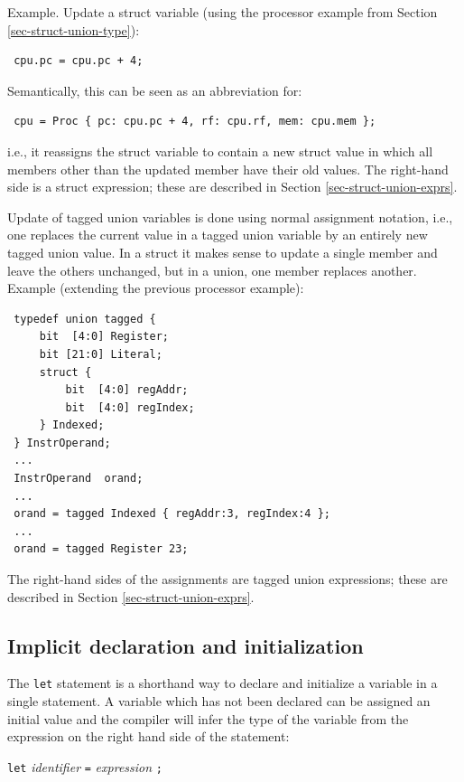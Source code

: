 \documentclass[twoside,letterpaper]{article}
\newcommand{\hm}{\hspace*{1em}}
\newcommand{\nterm}[1]{\emph{#1}}
\newcommand{\term}[1]{\texttt{#1}}
\newcommand{\gram}[2]{    \hm\makebox[10em][l]{\it #1}\makebox[1.5em][l]{::=}    #2}
\begin{document}
Example. Update a struct variable (using the processor example from
Section \ref{sec-struct-union-type}):
\begin{verbatim}
 cpu.pc = cpu.pc + 4;
\end{verbatim}
Semantically, this can be seen as an abbreviation for:
\begin{verbatim}
 cpu = Proc { pc: cpu.pc + 4, rf: cpu.rf, mem: cpu.mem };
\end{verbatim}
i.e., it reassigns the struct variable to contain a new struct value
in which all members other than the updated member have their old
values.  The right-hand side is a struct expression; these are
described in Section {\ref{sec-struct-union-exprs}}.

Update of tagged union variables is done using normal assignment
notation, i.e., one replaces the current value in a tagged union
variable by an entirely new tagged union value.  In a struct it makes
sense to update a single member and leave the others unchanged, but in
a union, one member replaces another.  Example (extending the previous
processor example):
\begin{verbatim}
 typedef union tagged {
     bit  [4:0] Register;
     bit [21:0] Literal;
     struct {
         bit  [4:0] regAddr;
         bit  [4:0] regIndex;
     } Indexed;
 } InstrOperand;
 ...
 InstrOperand  orand;
 ...
 orand = tagged Indexed { regAddr:3, regIndex:4 };
 ...
 orand = tagged Register 23;
\end{verbatim}
The right-hand sides of the assignments are tagged union expressions;
these are described in Section {\ref{sec-struct-union-exprs}}.



\subsection{Implicit declaration and initialization}


The \term{let} statement is a shorthand way to declare and initialize a
variable in a single statement.  A variable which has not been
declared can be assigned an initial value and the
compiler will infer the type of the variable from the expression on
the right hand side of the statement:

\gram{varDecl}{\term{let} \nterm{identifier} \term{=} \nterm{expression} \term{;} }
\end{document}

